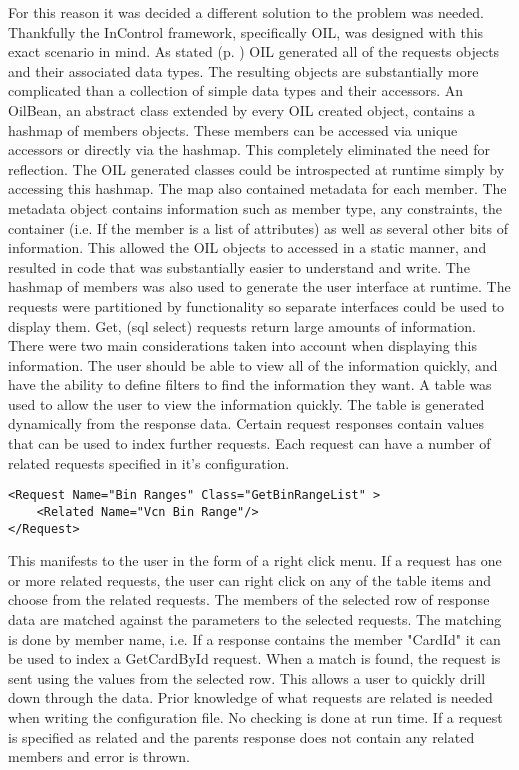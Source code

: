 \documentclass[a4paper, 11pt, titlepage]{article}
\begin{document}
For this reason it was decided a different solution to the problem was needed. Thankfully the InControl framework, specifically OIL, was designed with this exact scenario in mind. As stated (p. \pageref{OILIntro}) OIL generated all of the requests objects and their associated data types. The resulting objects are substantially more complicated than a collection of simple data types and their accessors. An OilBean, an abstract class extended by every OIL created object, contains a hashmap of members objects. These members can be accessed via unique accessors or directly via the hashmap. This completely eliminated the need for reflection. The OIL generated classes could be introspected at runtime simply by accessing this hashmap. The map also contained metadata for each member. \label{metadata} The metadata object contains information such as member type, any constraints, the container (i.e. If the member is a list of attributes) as well as several other bits of information. This allowed the OIL objects to accessed in a static manner, and resulted in code that was substantially easier to understand and write.
The hashmap of members was also used to generate the user interface at runtime. The requests were partitioned by functionality so separate interfaces could be used to display them. Get, (sql select) requests return large amounts of information. There were two main considerations taken into account when displaying this information. The user should be able to view all of the information quickly, and have the ability to define filters to find the information they want. A table was used to allow the user to view the information quickly. The table is generated dynamically from the response data. Certain request responses contain values that can be used to index further requests. Each request can have a number of related requests specified in it's configuration.

\begin{verbatim}
<Request Name="Bin Ranges" Class="GetBinRangeList" >
    <Related Name="Vcn Bin Range"/>
</Request>
\end{verbatim}

This manifests to the user in the form of a right click menu. If a request has one or more related requests, the user can right click on any of the table items and choose from the related requests. The members of the selected row of response data are matched against the parameters to the selected requests. The matching is done by member name, i.e. If a response contains the member "CardId" it can be used to index a GetCardById request. When a match is found, the request is sent using the values from the selected row. This allows a user to quickly drill down through the data. Prior knowledge of what requests are related is needed when writing the configuration file. No checking is done at run time. If a request is specified as related and the parents response does not contain any related members and error is thrown.
\end{document}
